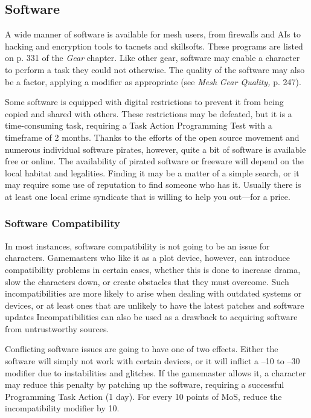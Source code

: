 \subsection{Software}

A wide manner of software is available for mesh users, 
from firewalls and AIs to hacking and encryption tools 
to tacnets and skillsofts. These programs are listed on 
p. 331 of the \textit{Gear }chapter. Like other gear, software 
may enable a character to perform a task they could 
not otherwise. The quality of the software may also be 
a factor, applying a modifier as appropriate (see \textit{Mesh }
\textit{Gear Quality,} p. 247).

Some software is equipped with digital restrictions 
to prevent it from being copied and shared with others. 
These restrictions may be defeated, but it is a time-consuming
task, requiring a Task Action Programming Test
with a timeframe of 2 months. Thanks to the efforts 
of the open source movement and numerous individual 
software pirates, however, quite a bit of software is 
available free or online. The availability of pirated software
or freeware will depend on the local habitat and
legalities. Finding it may be a matter of a simple search, 
or it may require some use of reputation to find someone
who has it. Usually there is at least one local crime
syndicate that is willing to help you out—for a price.

\subsubsection{Software Compatibility}

In most instances, software compatibility is not going 
to be an issue for characters. Gamemasters who like 
it as a plot device, however, can introduce compatibility
problems in certain cases, whether this is done
to increase drama, slow the characters down, or create 
obstacles that they must overcome. Such incompatibilities
are more likely to arise when dealing with
outdated systems or devices, or at least ones that are 
unlikely to have the latest patches and software updates
Incompatibilities can also be used as a drawback
to acquiring software from untrustworthy sources.

Conflicting software issues are going to have one of 
two effects. Either the software will simply not work 
with certain devices, or it will inflict a –10 to –30 
modifier due to instabilities and glitches. If the gamemaster
allows it, a character may reduce this penalty
by patching up the software, requiring a successful 
Programming Task Action (1 day). For every 10 points 
of MoS, reduce the incompatibility modifier by 10.

